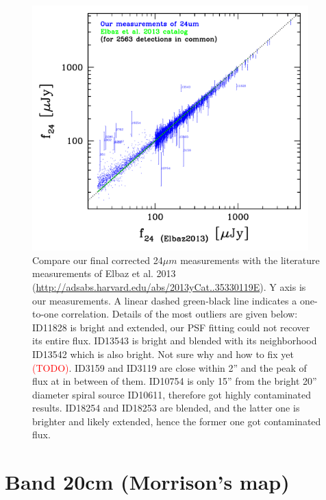 \documentclass[11pt,a4paper]{article}
\begin{document}
\begin{figure}[H]
	\includegraphics[width=0.95\textwidth]{Compare_measurments_of_24um_with_Elbaz_2013}
	\caption{Compare our final corrected 24${\mu}m$ measurements with the literature measurements of Elbaz et al. 2013 (\url{http://adsabs.harvard.edu/abs/2013yCat..35330119E}). Y axis is our measurements. A linear dashed green-black line indicates a one-to-one correlation. Details of the most outliers are given below: ID11828 is bright and extended, our PSF fitting could not recover its entire flux. ID13543 is bright and blended with its neighborhood ID13542 which is also bright. Not sure why and how to fix yet \textcolor{red}{(TODO)}. ID3159 and ID3119 are close within 2'' and the peak of flux at in between of them. ID10754 is only 15'' from the bright 20'' diameter spiral source ID10611, therefore got highly contaminated results. ID18254 and ID18253 are blended, and the latter one is brighter and likely extended, hence the former one got contaminated flux.}
\end{figure}


\clearpage

\section{Band 20cm (Morrison's map)}
\end{document}
